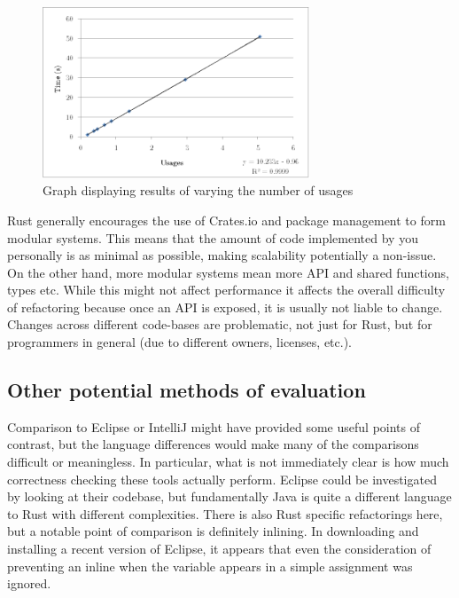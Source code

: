 \begin{figure}[h]
\begin{center}

\includegraphics[width=8cm]{scaling}

\caption{Graph displaying results of varying the number of usages}
\label{Fig:comparerefs}
\end{center}
\end{figure}

Rust generally encourages the use of Crates.io and package management to form modular systems. This means that the amount of code implemented by you personally is as minimal as possible, making scalability potentially a non-issue. On the other hand, more modular systems mean more API and shared functions, types etc. While this might not affect performance it affects the overall difficulty of refactoring because once an API is exposed, it is usually not liable to change. Changes across different code-bases are problematic, not just for Rust, but for programmers in general (due to different owners, licenses, etc.).





\subsection{Other potential methods of evaluation} \label{S:otherstuff}
Comparison to Eclipse or IntelliJ might have provided some useful points of contrast, but the language differences would make many of the comparisons difficult or meaningless. In particular, what is not immediately clear is how much correctness checking these tools actually perform. Eclipse could be investigated by looking at their codebase, but fundamentally Java is quite a different language to Rust with different complexities. There is also Rust specific refactorings here, but a notable point of comparison is definitely inlining. In downloading and installing a recent version of Eclipse, it appears that even the consideration of preventing an inline when the variable appears in a simple assignment was ignored.

